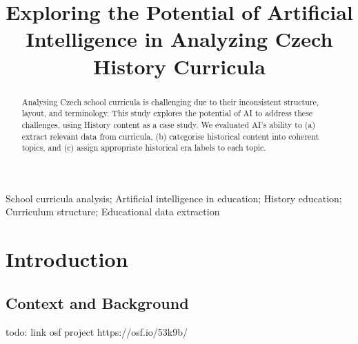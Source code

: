 \documentclass[]{interact}
\theoremstyle{plain}%
\theoremstyle{definition}
\theoremstyle{remark}
\begin{document}

\title{Exploring the Potential of Artificial Intelligence in Analyzing Czech History Curricula}

\author{
}

\maketitle

\begin{abstract}
Analysing Czech school curricula is challenging due to their inconsistent structure, layout, and terminology. This study explores the potential of AI to address these challenges, using History content as a case study. We evaluated AI's ability to (a) extract relevant data from curricula, (b) categorise historical content into coherent topics, and (c) assign appropriate historical era labels to each topic.

\end{abstract}

\begin{keywords}
School curricula analysis;
Artificial intelligence in education;
History education;
Curriculum structure;
Educational data extraction

\end{keywords}


\section{Introduction}

\subsection{Context and Background}

todo: link osf project https://osf.io/53k9b/

\end{document}
